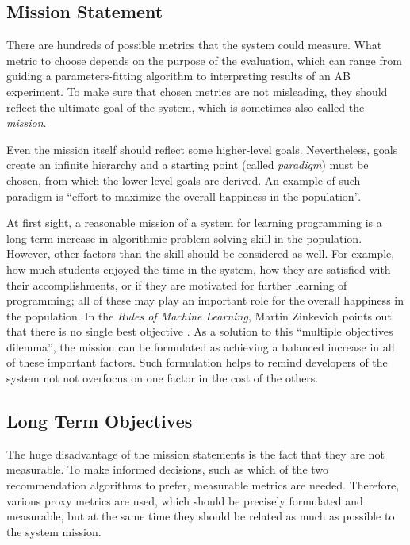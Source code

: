 \subsection{Mission Statement}
\label{sec:mission}

There are hundreds of possible metrics that the system could measure.
What metric to choose depends on the purpose of the evaluation,
  which can range from guiding a parameters-fitting algorithm
  to interpreting results of an AB experiment.
To make sure that chosen metrics are not misleading,
  they should reflect the ultimate goal of the system,
  which is sometimes also called the \emph{mission}.

Even the mission itself should reflect some higher-level goals.
Nevertheless, goals create an infinite hierarchy
  and a starting point (called \emph{paradigm}) must be chosen,
  from which the lower-level goals are derived.
An example of such paradigm is
  ``effort to maximize the overall happiness in the population''.

At first sight, a reasonable mission of a system for learning programming
  is a long-term increase in algorithmic-problem solving skill in the population.
However, other factors than the skill should be considered as well.
For example, how much students enjoyed the time in the system,
  how they are satisfied with their accomplishments,
  or if they are motivated for further learning of programming;
  all of these may play an important role for the overall happiness in the population.
In the \emph{Rules of Machine Learning}, Martin Zinkevich
  points out that there is no single best objective \cite[][Rule \#39]{google-ml-rules}.
As a solution to this ``multiple objectives dilemma'',
  the mission can be formulated as achieving a balanced increase in all
  of these important factors.
Such formulation helps to remind developers of the system not not overfocus on one factor
  in the cost of the others.


\subsection{Long Term Objectives}
\label{sec:long-term-objectives}

The huge disadvantage of the mission statements
  is the fact that they are not measurable.
To make informed decisions,
  such as which of the two recommendation algorithms to prefer,
  measurable metrics are needed.
Therefore, various proxy metrics are used,
  which should be precisely formulated and measurable,
  but at the same time they should be related as much as possible to the system mission.

